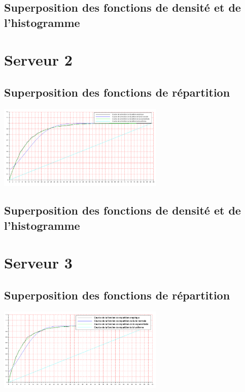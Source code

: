 \documentclass{article}
\begin{document}
\paragraph{}

\subsection{Superposition des fonctions de densité et de l'histogramme}

\section{Serveur 2}

\subsection{Superposition des fonctions de répartition}
\begin{center}
\includegraphics[width=300px]{img/S2_repartitions.png}
\end{center}
\paragraph{}

\subsection{Superposition des fonctions de densité et de l'histogramme}

\section{Serveur 3}

\subsection{Superposition des fonctions de répartition}
\begin{center}
\includegraphics[width=300px]{img/S3_repartitions.png}
\end{center}
\end{document}
